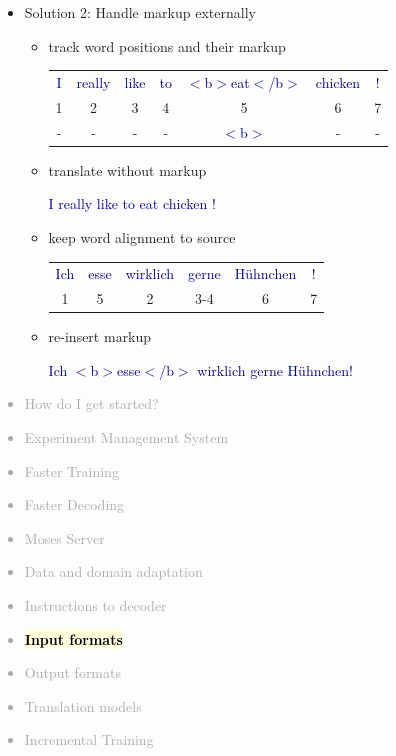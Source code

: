 \documentclass[landscape]{uedslides2C}
\newcommand{\example}[1]{\textcolor{darkblue}{\rm #1}}
\newcommand{\currenttopic}[1]{\colorbox{lightyellow}{\textcolor{black}{\bf #1}}}
\begin{document}
\begin{itemize}
\item Solution 2: Handle markup externally
\begin{itemize} \itemsep 5mm
\item track word positions and their markup
\begin{center}
\begin{tabular}{ccccccc}
\example{I} & \example{really} & \example{like} & \example{to} & \example{$<$b$>$eat$<$/b$>$} & \example{chicken} & \example{!} \\
1 & 2 & 3 & 4 & 5 & 6 & 7\\
-&-&-&-&\example{$<$b$>$}&-&-\\
\end{tabular}
\end{center}

\item translate without markup
\begin{center}
\example{I really like to eat chicken !}
\end{center}

\item keep word alignment to source
\begin{center}
\begin{tabular}{cccccc}
\example{Ich} & \example{esse} & \example{wirklich} & \example{gerne} & \example{H{\"u}hnchen} & \example{!} \\
1 & 5 & 2 & 3-4 & 6 & 7\\
\end{tabular}
\end{center}

\item re-insert markup
\begin{center}
\example{Ich $<$b$>$esse$<$/b$>$ wirklich gerne H{\"u}hnchen!}
\end{center}

\end{itemize}
\end{itemize}


\vspace{-5mm}
\textcolor{darkgrey}{
\small
\begin{itemize} \itemsep -1mm
\item {How do I get started?}
\item {Experiment Management System}
\item {Faster Training}
\item {Faster Decoding}
\item {Moses Server}
\item {Data and domain adaptation}
\item {Instructions to decoder}
\item \currenttopic{Input formats}
\item {Output formats}
\item {Translation models}
\item {Incremental Training}
\end{itemize}
}
\end{document}
